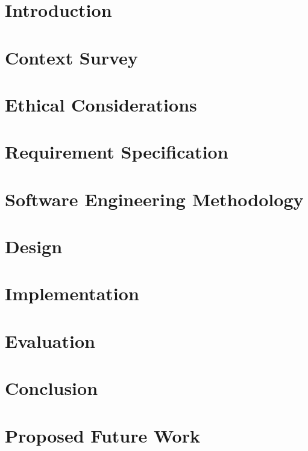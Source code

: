 \documentclass[
11pt, %
oneside, %
english, %
singlespacing, %
liststotoc, %
toctotoc, %
parskip, %
headsepline, %
]{MastersDoctoralThesis} %
\newcommand{\chapterinput}[1]{}
\begin{document}
\chapter{Introduction}
\chapterinput{introduction.tex}

\chapter{Context Survey}
\chapterinput{context_survey.tex}

\chapter{Ethical Considerations}
\chapterinput{ethics.tex}

\chapter{Requirement Specification}
\chapterinput{requirements.tex}

\chapter{Software Engineering Methodology}
\chapterinput{software_engineering.tex}

\chapter{Design}
\chapterinput{design.tex}

\chapter{Implementation}
\chapterinput{implementation.tex}

\chapter{Evaluation}
\chapterinput{evaluation.tex}

\chapter{Conclusion}
\chapterinput{conclusion.tex}

\chapter{Proposed Future Work}
\chapterinput{future.tex}
\end{document}

